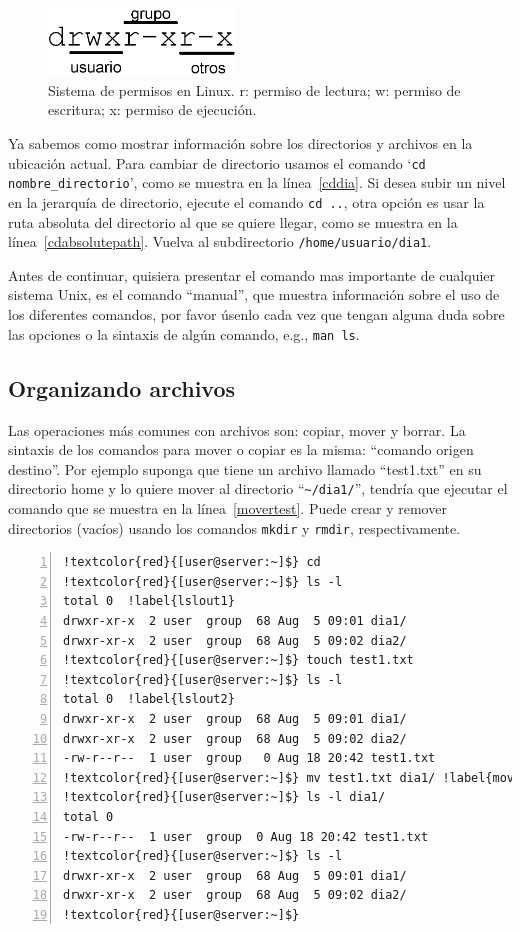 \documentclass[letter,11pt]{book}
\begin{document}
\begin{figure}[ht]
\centering
   \includegraphics[width=5cm]{Figs/permisos.png}
  \caption[Sistema de permisos en Linux]{\label{permisos}Sistema de permisos en Linux. r: permiso de lectura; w: permiso de escritura; x: permiso de ejecución.}
\end{figure}

Ya sabemos como mostrar información sobre los directorios y archivos en la ubicación actual.  Para cambiar de directorio usamos el comando `\Verb+cd nombre_directorio+', como se muestra en la línea~\ref{cddia}. Si desea subir un nivel en la jerarquía de directorio, ejecute el comando \Verb+cd ..+, otra opción es usar la ruta absoluta del directorio al que se quiere llegar, como se muestra en la línea~\ref{cdabsolutepath}. Vuelva al subdirectorio \Verb+/home/usuario/dia1+.

Antes de continuar, quisiera presentar el comando mas importante de cualquier sistema Unix, es el comando ``manual'', que muestra información sobre el uso de los diferentes comandos, por favor úsenlo cada vez que tengan alguna duda sobre las opciones o la sintaxis de algún comando, e.g., \Verb+man ls+.

\subsection{Organizando archivos}

Las operaciones más comunes con archivos son: copiar, mover y borrar.  La sintaxis de los comandos para mover o copiar es la misma: ``comando origen destino''.  Por ejemplo suponga que tiene un archivo llamado ``test1.txt'' en su directorio home y lo quiere mover al directorio ``\Verb+~/dia1/+'', tendría que ejecutar el comando que se muestra en la línea~\ref{movertest}. Puede crear y remover directorios (vacíos) usando los comandos \Verb+mkdir+ y \Verb+rmdir+, respectivamente.

\begin{Verbatim}[commandchars=!\{\},numbers=left,firstnumber=last,label=Organizando archivos y directorios,frame=topline,fontsize=\scriptsize]
!textcolor{red}{[user@server:~]$} cd
!textcolor{red}{[user@server:~]$} ls -l
total 0  !label{lslout1}
drwxr-xr-x  2 user  group  68 Aug  5 09:01 dia1/
drwxr-xr-x  2 user  group  68 Aug  5 09:02 dia2/
!textcolor{red}{[user@server:~]$} touch test1.txt
!textcolor{red}{[user@server:~]$} ls -l
total 0  !label{lslout2}
drwxr-xr-x  2 user  group  68 Aug  5 09:01 dia1/
drwxr-xr-x  2 user  group  68 Aug  5 09:02 dia2/
-rw-r--r--  1 user  group   0 Aug 18 20:42 test1.txt
!textcolor{red}{[user@server:~]$} mv test1.txt dia1/ !label{movertest}
!textcolor{red}{[user@server:~]$} ls -l dia1/
total 0
-rw-r--r--  1 user  group  0 Aug 18 20:42 test1.txt
!textcolor{red}{[user@server:~]$} ls -l
drwxr-xr-x  2 user  group  68 Aug  5 09:01 dia1/
drwxr-xr-x  2 user  group  68 Aug  5 09:02 dia2/
!textcolor{red}{[user@server:~]$}
\end{Verbatim} 
\end{document}
